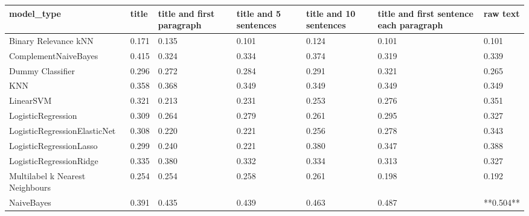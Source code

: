 \begin{tabular}{lllllll}
\toprule
                     model\_type & title & title and first paragraph & title and 5 sentences & title and 10 sentences & title and first sentence each paragraph &  raw text \\
\midrule
           Binary Relevance kNN & 0.171 &                     0.135 &                 0.101 &                  0.124 &                                   0.101 &     0.101 \\
           ComplementNaiveBayes & 0.415 &                     0.324 &                 0.334 &                  0.374 &                                   0.319 &     0.339 \\
               Dummy Classifier & 0.296 &                     0.272 &                 0.284 &                  0.291 &                                   0.321 &     0.265 \\
                            KNN & 0.358 &                     0.368 &                 0.349 &                  0.349 &                                   0.349 &     0.349 \\
                      LinearSVM & 0.321 &                     0.213 &                 0.231 &                  0.253 &                                   0.276 &     0.351 \\
             LogisticRegression & 0.309 &                     0.264 &                 0.279 &                  0.261 &                                   0.295 &     0.327 \\
   LogisticRegressionElasticNet & 0.308 &                     0.220 &                 0.221 &                  0.256 &                                   0.278 &     0.343 \\
        LogisticRegressionLasso & 0.299 &                     0.240 &                 0.221 &                  0.380 &                                   0.347 &     0.388 \\
        LogisticRegressionRidge & 0.335 &                     0.380 &                 0.332 &                  0.334 &                                   0.313 &     0.327 \\
Multilabel k Nearest Neighbours & 0.254 &                     0.254 &                 0.258 &                  0.261 &                                   0.198 &     0.192 \\
                     NaiveBayes & 0.391 &                     0.435 &                 0.439 &                  0.463 &                                   0.487 & **0.504** \\

\end{tabular}
